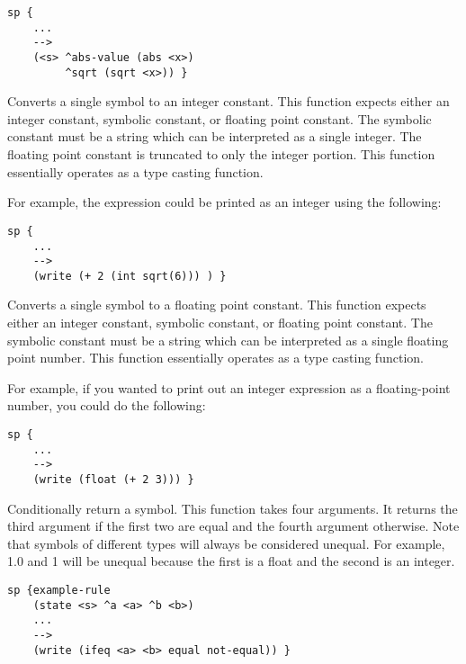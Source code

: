 \begin{description}
\begin{verbatim}
sp {
    ...
    -->
    (<s> ^abs-value (abs <x>)
         ^sqrt (sqrt <x>)) }
\end{verbatim}


\item [\soarb{int} --- ] Converts a single symbol to an integer constant. This
        function expects either an integer constant, symbolic constant, or
        floating point constant. The symbolic constant must be a string which
        can be interpreted as a single integer. The floating point constant is
        truncated to only the integer portion. This function essentially
        operates as a type casting function.

        For example, the expression  could be printed
        as an integer using the following:

\begin{verbatim}
sp {
    ...
    -->
    (write (+ 2 (int sqrt(6))) ) }
\end{verbatim}

\item [\soarb{float} --- ] Converts a single symbol to a floating point 
constant.
        This function expects either an integer constant, symbolic constant,
        or floating point constant. The symbolic constant must be a string
        which can be interpreted as a single floating point number. This
        function essentially operates as a type casting function. 

        For example, if you wanted to print out an integer expression as a
        floating-point number, you could do the following:

\begin{verbatim}
sp {
    ...
    -->
    (write (float (+ 2 3))) }
\end{verbatim}

\item [\soarb{ifeq} --- ] Conditionally return a symbol.
        This function takes four arguments. It returns the third argument if
        the first two are equal and the fourth argument otherwise. Note that
        symbols of different types will always be considered unequal. For example,
        1.0 and 1 will be unequal because the first is a float and the second is
        an integer.

\begin{verbatim}
sp {example-rule
    (state <s> ^a <a> ^b <b>)
    ...
    -->
    (write (ifeq <a> <b> equal not-equal)) }
\end{verbatim}
\end{description}

